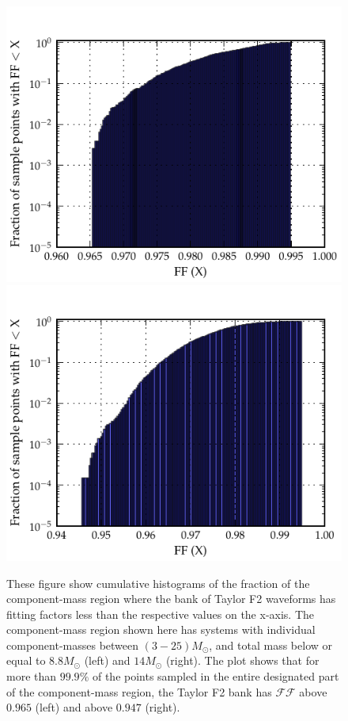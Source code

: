 \documentclass[aps,
prd,
amsmath,
amssymb,
twocolumn,
floatfix,
groupedaddress]{revtex4-1}
\begin{document}
\begin{figure}
\centerline{
\includegraphics[scale=0.04, clip=false,keepaspectratio=true, width=\columnwidth]{EOBHMvsF2cutcumhist8-8.pdf}
\includegraphics[scale=0.04, clip=false, keepaspectratio=true, width=\columnwidth]{EOBHMvsF2cutcumhist14.pdf}
}
\caption{\label{fig:cumhist_f2eob_cut14}These figure show cumulative histograms of the fraction of the component-mass region where the bank of Taylor F2 waveforms has fitting factors less than the respective values on the x-axis. The component-mass region shown here has systems with individual component-masses between $(3-25)M_{\odot}$, and total mass below or equal to $8.8M_{\odot}$ (left) and $14M_{\odot}$ (right). The plot shows that for more than $99.9\%$ of the points sampled in the entire designated part of the component-mass region, the Taylor F2 bank has $\mathcal{FF}$ above $0.965$ (left) and above $0.947$ (right).}
\end{figure}
\end{document}
